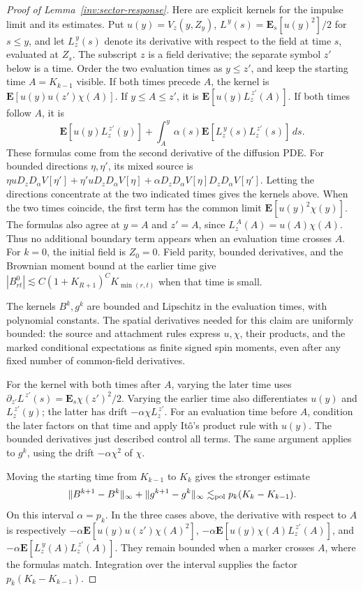 \begin{proof}[Proof of Lemma~\ref{inv:sector-response}]
Here are explicit kernels for the impulse limit and its estimates. Put
\(u(y)=V_z(y,Z_y)\),
\(L^{\,y}(s)=\mathbf E_s[u(y)^2]/2\) for \(s\le y\), and let
\(L_z^{\,y}(s)\) denote its derivative with respect to the field at
time \(s\), evaluated at \(Z_s\). The subscript \(z\) is a field
derivative; the separate symbol \(z'\) below is a time. Order the two
evaluation times as \(y\le z'\), and keep the starting time
\(A=K_{k-1}\) visible. If both times precede \(A\), the kernel is
\(\mathbf E[u(y)u(z')\chi(A)]\). If
\(y\le A\le z'\), it is \(\mathbf E[u(y)L_z^{\,z'}(A)]\).
If both times follow \(A\), it is
\[
 \mathbf E[u(y)L_z^{\,z'}(y)]
       +\int_A^y \alpha(s)\mathbf E[L_z^{\,y}(s)L_z^{\,z'}(s)]\,ds .
\]
These formulas come from the second derivative of the diffusion PDE.
For bounded directions \(\eta,\eta'\), its mixed source is
\(\eta u D_zD_\alpha V[\eta']+
\eta' u D_zD_\alpha V[\eta]+
\alpha D_zD_\alpha V[\eta]D_zD_\alpha V[\eta']\).
Letting the directions concentrate at the two indicated times gives
the kernels above. When the two times coincide, the first term has
the common limit \(\mathbf E[u(y)^2\chi(y)]\).
The formulas also agree at \(y=A\) and \(z'=A\), since
\(L_z^{\,A}(A)=u(A)\chi(A)\). Thus no additional boundary term
appears when an evaluation time crosses \(A\).
For \(k=0\), the initial field is \(Z_0=0\). Field parity, bounded
derivatives, and the Brownian moment bound at the earlier time give
\(|B^0_{rt}|\lesssim C(1+K_{R+1})^C K_{\min(r,t)}\) when that time
is small.

The kernels \(B^k,g^k\) are bounded and Lipschitz in the evaluation
times, with polynomial constants. The spatial derivatives needed for
this claim are uniformly bounded: the source and attachment rules
express \(u,\chi\), their products, and the marked conditional
expectations as finite signed spin moments, even after any fixed number
of common-field derivatives.

For the kernel with both times after \(A\), varying the later time
uses \(\partial_{z'}L^{\,z'}(s)=\mathbf E_s\chi(z')^2/2\).
Varying the earlier time also differentiates \(u(y)\) and
\(L_z^{\,z'}(y)\); the latter has drift
\(-\alpha\chi L_z^{\,z'}\). For an evaluation time before \(A\),
condition the later factors on that time and apply It\^o's product rule
with \(u(y)\). The bounded derivatives just described control all
terms. The same argument applies to \(g^k\), using the drift
\(-\alpha\chi^2\) of \(\chi\).

Moving the starting time from \(K_{k-1}\) to \(K_k\) gives the
stronger estimate
\[
 \|B^{k+1}-B^k\|_\infty+\|g^{k+1}-g^k\|_\infty
    \lesssim_{\rm pol} p_k(K_k-K_{k-1}).
\]
On this interval \(\alpha=p_k\). In the three cases above, the
derivative with respect to \(A\) is respectively
\(-\alpha\mathbf E[u(y)u(z')\chi(A)^2]\),
\(-\alpha\mathbf E[u(y)\chi(A)L_z^{\,z'}(A)]\), and
\(-\alpha\mathbf E[L_z^{\,y}(A)L_z^{\,z'}(A)]\).
They remain bounded when a marker crosses \(A\), where the formulas
match. Integration over the interval supplies the factor
\(p_k(K_k-K_{k-1})\).


\end{proof}
